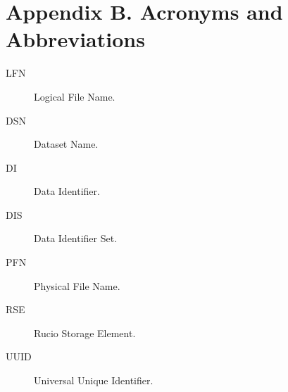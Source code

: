 \documentclass{atlasnote}
\begin{document}
\newpage
\section*{Appendix B. Acronyms and Abbreviations}
\label{Acronyms_and_Abbreviations:acronyms-and-abbreviations}\label{Acronyms_and_Abbreviations::doc}\begin{description}
\item[{LFN}] \leavevmode
Logical File Name.

\item[{DSN}] \leavevmode
Dataset Name.

\item[{DI}] \leavevmode
Data Identifier.

\item[{DIS}] \leavevmode
Data Identifier Set.

\item[{PFN}] \leavevmode
Physical File Name.

\item[{RSE}] \leavevmode
Rucio Storage Element.

\item[{UUID}] \leavevmode
Universal Unique Identifier.

\end{description}
\end{document}
